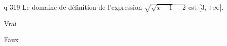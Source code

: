 \begin{truefalse}{q-319}
Le domaine de définition de l'expression $\sqrt{\sqrt{x-1}-2}$ est $[3,+\infty[$.
\item Vrai
\item* Faux
\end{truefalse}

